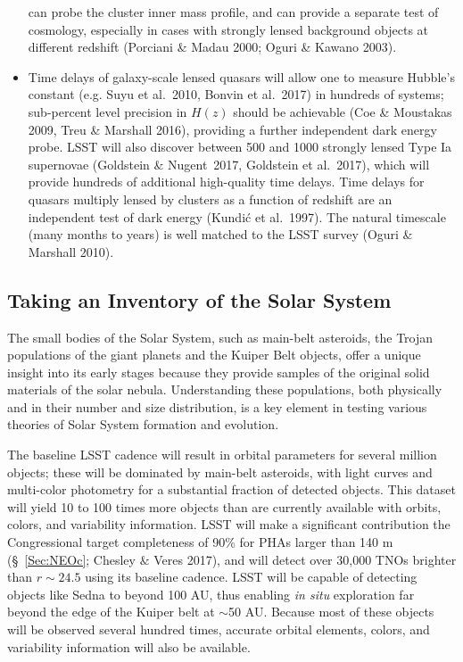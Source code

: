 \begin{itemize}
 can probe the cluster inner mass profile, and can provide a separate test of cosmology, especially
in cases with strongly lensed background objects at different redshift (Porciani \& Madau 2000; Oguri \& Kawano 2003).
\item Time delays of galaxy-scale lensed quasars will allow one to measure Hubble's constant
(e.g. Suyu et al.~2010, Bonvin et al.~2017) in hundreds of systems; sub-percent level precision in
$H(z)$ should be achievable (Coe \& Moustakas 2009, Treu \& Marshall 2016), providing a further independent dark energy probe.
LSST will also discover between 500 and 1000 strongly lensed Type Ia supernovae (Goldstein \& Nugent~2017, Goldstein et al.~2017), which will provide hundreds of additional high-quality time delays.
Time delays for quasars multiply lensed by clusters as a function of redshift are an independent test
of dark energy (Kundi\'{c} et al.~1997). The natural timescale (many months to years) is well matched
to the LSST survey (Oguri \& Marshall 2010).
\end{itemize}


\subsection{Taking an Inventory of the Solar System}



The small bodies of the Solar System, such as main-belt asteroids,
the Trojan populations of the giant planets and the Kuiper Belt objects,
offer a unique insight into its early stages because they provide
samples of the original solid materials of the solar nebula.
Understanding these populations, both physically and in their number
and size distribution, is a key element in testing various theories of
Solar System formation and evolution.

The baseline LSST cadence will result in orbital parameters for several
million objects; these will be dominated by main-belt asteroids, with
light curves and multi-color photometry for a substantial fraction of detected objects.
This dataset will yield 10 to 100 times more objects than are currently
available with orbits, colors, and variability information. LSST will make a significant contribution the Congressional target
completeness of 90\% for PHAs larger than 140 m (\S~\ref{Sec:NEOc}; Chesley $\&$ Veres 2017), and will detect over 30,000 TNOs brighter than $r\sim24.5$ using its baseline cadence. LSST will be capable
of detecting objects like Sedna to beyond 100 AU, thus enabling {\it in situ} exploration
far beyond the edge of the Kuiper belt at $\sim$50 AU. Because most of these
objects will be observed several hundred times, accurate orbital elements,
colors, and variability information will also be available.


